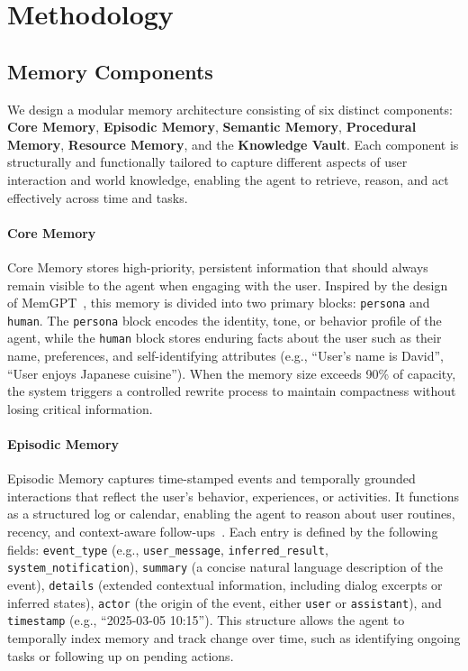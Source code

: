 \section{Methodology}

\subsection{Memory Components}

We design a modular memory architecture consisting of six distinct components: \textbf{Core Memory}, \textbf{Episodic Memory}, \textbf{Semantic Memory}, \textbf{Procedural Memory}, \textbf{Resource Memory}, and the \textbf{Knowledge Vault}. Each component is structurally and functionally tailored to capture different aspects of user interaction and world knowledge, enabling the agent to retrieve, reason, and act effectively across time and tasks.

\paragraph{Core Memory} 
Core Memory stores high-priority, persistent information that should always remain visible to the agent when engaging with the user. Inspired by the design of MemGPT~\citep{memgpt}, this memory is divided into two primary blocks: \texttt{persona} and \texttt{human}. The \texttt{persona} block encodes the identity, tone, or behavior profile of the agent, while the \texttt{human} block stores enduring facts about the user such as their name, preferences, and self-identifying attributes (e.g., ``User’s name is David'', ``User enjoys Japanese cuisine''). When the memory size exceeds 90\% of capacity, the system triggers a controlled rewrite process to maintain compactness without losing critical information. 

\paragraph{Episodic Memory} 
Episodic Memory captures time-stamped events and temporally grounded interactions that reflect the user's behavior, experiences, or activities. It functions as a structured log or calendar, enabling the agent to reason about user routines, recency, and context-aware follow-ups~\citep{Liao2024,episodic_memory_missing_piece,echo}. Each entry is defined by the following fields: \texttt{event\_type} (e.g., \texttt{user\_message}, \texttt{inferred\_result}, \texttt{system\_notification}), \texttt{summary} (a concise natural language description of the event), \texttt{details} (extended contextual information, including dialog excerpts or inferred states), \texttt{actor} (the origin of the event, either \texttt{user} or \texttt{assistant}), and \texttt{timestamp} (e.g., ``2025-03-05 10:15''). This structure allows the agent to temporally index memory and track change over time, such as identifying ongoing tasks or following up on pending actions.

